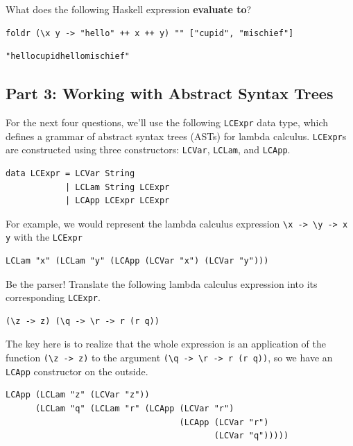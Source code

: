 \documentclass[addpoints]{exam}
\begin{document}
\begin{questions}
\question[5] What does the following Haskell expression \textbf{evaluate to}?

\begin{verbatim}
foldr (\x y -> "hello" ++ x ++ y) "" ["cupid", "mischief"]
\end{verbatim}

\begin{solutionorbox}[1.25in]
\begin{verbatim}
"hellocupidhellomischief"
\end{verbatim}
\end{solutionorbox}

\newpage

\subsection*{\textbf{Part 3: Working with Abstract Syntax Trees}}

\noindent For the next four questions, we'll use the following \verb|LCExpr| data type, which defines a grammar of abstract syntax trees (ASTs) for lambda calculus.  \verb|LCExpr|s are constructed using three constructors: \verb|LCVar|, \verb|LCLam|, and \verb|LCApp|.

\begin{verbatim}
data LCExpr = LCVar String 
            | LCLam String LCExpr 
            | LCApp LCExpr LCExpr
\end{verbatim}

For example, we would represent the lambda calculus expression \verb|\x -> \y -> x y| with the \verb|LCExpr|

\begin{verbatim}
LCLam "x" (LCLam "y" (LCApp (LCVar "x") (LCVar "y")))
\end{verbatim}

\question[4] Be the parser!  Translate the following lambda calculus expression into its corresponding \verb|LCExpr|.

\begin{verbatim}
(\z -> z) (\q -> \r -> r (r q))
\end{verbatim}

\begin{solutionorbox}[1.25in]
The key here is to realize that the whole expression is an application of the function \verb|(\z -> z)| to the argument \verb|(\q -> \r -> r (r q))|, so we have an \verb|LCApp| constructor on the outside.
\begin{verbatim}  
LCApp (LCLam "z" (LCVar "z"))
      (LCLam "q" (LCLam "r" (LCApp (LCVar "r")
                                   (LCApp (LCVar "r")
                                          (LCVar "q")))))
\end{verbatim}
  

\end{solutionorbox}
\end{questions}
\end{document}

